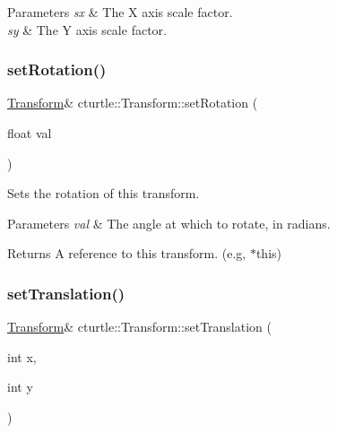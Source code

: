 \begin{DoxyParams}{Parameters}
{\em sx} & The X axis scale factor. \\
\hline
{\em sy} & The Y axis scale factor. \\
\hline
\end{DoxyParams}
\mbox{\label{classcturtle_1_1Transform_aafed415c37989dcc34ed5cadd7366487}} 
\subsubsection{\texorpdfstring{set\+Rotation()}{setRotation()}}
{\footnotesize\ttfamily \hyperlink{classcturtle_1_1Transform}{Transform}\& cturtle\+::\+Transform\+::set\+Rotation (\begin{DoxyParamCaption}\item[{float}]{val }\end{DoxyParamCaption})\hspace{0.3cm}{\ttfamily [inline]}}



Sets the rotation of this transform. 


\begin{DoxyParams}{Parameters}
{\em val} & The angle at which to rotate, in radians. \\
\hline
\end{DoxyParams}
\begin{DoxyReturn}{Returns}
A reference to this transform. (e.\+g, $\ast$this) 
\end{DoxyReturn}
\mbox{\label{classcturtle_1_1Transform_a99366b0667eab2ea5f4f194f8500f94a}} 
\subsubsection{\texorpdfstring{set\+Translation()}{setTranslation()}}
{\footnotesize\ttfamily \hyperlink{classcturtle_1_1Transform}{Transform}\& cturtle\+::\+Transform\+::set\+Translation (\begin{DoxyParamCaption}\item[{int}]{x,  }\item[{int}]{y }\end{DoxyParamCaption})\hspace{0.3cm}{\ttfamily [inline]}}




